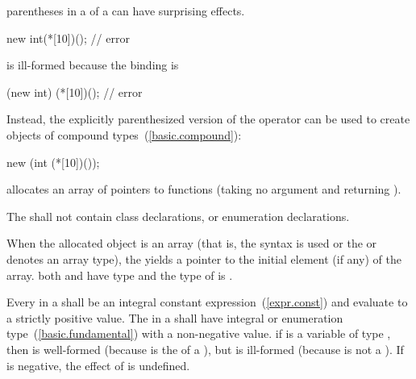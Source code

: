 \pnum
\enternote 
{}%
parentheses in a  of a 
can have surprising effects.
\enterexample 

\begin{codeblock}
new int(*[10])();               // error
\end{codeblock}

is ill-formed because the binding is

\begin{codeblock}
(new int) (*[10])();            // error
\end{codeblock}

Instead, the explicitly parenthesized version of the 
operator can be used to create objects of compound
types~(\ref{basic.compound}):

\begin{codeblock}
new (int (*[10])());
\end{codeblock}

allocates an array of  pointers to functions (taking no
argument and returning ).
\exitexample 
\exitnote 

\pnum
The  shall not contain class declarations,
or enumeration declarations.

\pnum
{}%
When the allocated object is an array (that is, the
 syntax is used or the
 or  denotes an array type), the
 yields a pointer to the initial element (if
any) of the array.
\enternote 
both  and  have type  and
the type of  is .
\exitnote 

\pnum
Every  in a
 shall be an integral constant
expression~(\ref{expr.const}) and evaluate to a strictly positive value.
%
The  in a  shall
have integral or enumeration type~(\ref{basic.fundamental}) with a
non-negative value.
\enterexample
if  is a variable of type , then
 is well-formed (because  is the
 of a ), but
 is ill-formed (because  is not a
). If  is negative, the effect
of  is undefined.
\exitexample 

